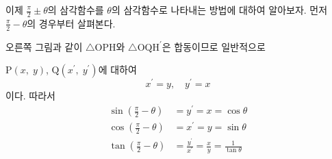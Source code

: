 \documentclass[11pt, a4paper]{book}
\begin{document}
이제 $\frac{\pi}{2} \pm \theta$의 삼각함수를 $\theta$의 삼각함수로 나타내는 방법에 대하여 알아보자. 먼저 $\frac{\pi}{2} - \theta$의 경우부터 살펴본다.

오른쪽 그림과 같이 $\triangle\textrm{OPH}$와 $\triangle \textrm{OQH}^{\prime}$은 합동이므로 일반적으로 

\begin{minipage}{0.6\textwidth}
$\textrm{P}(x,\;y)$, $\textrm{Q}(x^{\prime},\;y^{\prime})$에 대하여
	\[
	x^{\prime} = y,  \quad y^{\prime} = x
	\]
	이다. 따라서
	\begin{align*}
		\sin\left(\frac{\pi}{2}-\theta\right) &=y^{\prime} =x = \cos\theta \\
		\cos\left(\frac{\pi}{2}-\theta\right) & = x^{\prime} =y=\sin\theta \\
		\tan\left(\frac{\pi}{2}-\theta\right) & = \frac{y^{\prime}}{x^{\prime}} =\frac{x}{y} = \frac{1}{\tan\theta}
	\end{align*}
\end{minipage}
\end{document}
